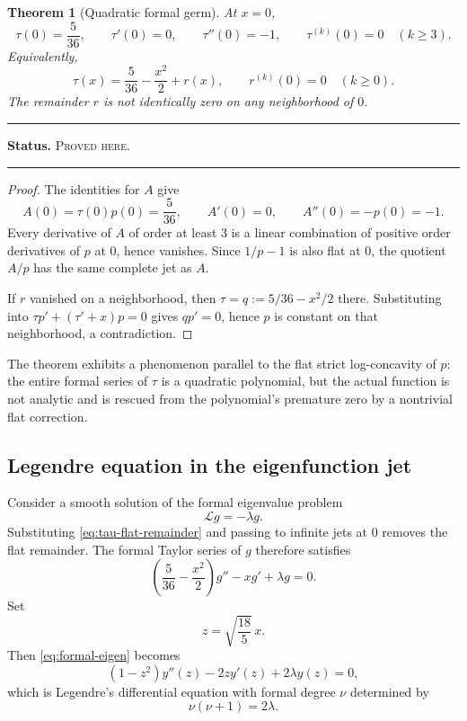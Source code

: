 \documentclass[11pt,oneside]{article}
\newtheorem{theorem}{Theorem}[section]
\theoremstyle{definition}
\theoremstyle{remark}
\newenvironment{boxedremark}{%
  \par\smallskip\noindent\begin{center}\begin{minipage}{0.94\textwidth}%
  \color{black}\hrule\vspace{0.6em}\small
}{%
  \vspace{0.6em}\hrule\end{minipage}\end{center}\smallskip
}
\newcommand{\ProvedHere}{\textsc{Proved here}}
\newcommand{\Status}[1]{%
  \begin{boxedremark}\textbf{Status.} #1.\end{boxedremark}}
\begin{document}
\begin{theorem}[Quadratic formal germ]\label{thm:tau-center-jet}
At $x=0$,
\begin{equation}\label{eq:tau-center-jet}
 \tau(0)=\frac5{36},\qquad
 \tau'(0)=0,\qquad
 \tau''(0)=-1,\qquad
 \tau^{(k)}(0)=0\quad(k\ge3).
\end{equation}
Equivalently,
\begin{equation}\label{eq:tau-flat-remainder}
 \tau(x)=\frac5{36}-\frac{x^2}{2}+r(x),
 \qquad r^{(k)}(0)=0\quad(k\ge0).
\end{equation}
The remainder $r$ is not identically zero on any neighborhood of $0$.
\end{theorem}
\Status{\ProvedHere}

\begin{proof}
The identities for $A$ give
\[
 A(0)=\tau(0)p(0)=\frac5{36},\qquad
 A'(0)=0,
 \qquad A''(0)=-p(0)=-1.
\]
Every derivative of $A$ of order at least $3$ is a linear combination of positive
order derivatives of $p$ at $0$, hence vanishes.  Since $1/p-1$ is also flat at
$0$, the quotient $A/p$ has the same complete jet as $A$.

If $r$ vanished on a neighborhood, then $\tau=q:=5/36-x^2/2$ there.  Substituting
into $\tau p'+(\tau'+x)p=0$ gives $q p'=0$, hence $p$ is constant on that
neighborhood, a contradiction.
\end{proof}

The theorem exhibits a phenomenon parallel to the flat strict log-concavity of
$p$: the entire formal series of $\tau$ is a quadratic polynomial, but the actual
function is not analytic and is rescued from the polynomial's premature zero by a
nontrivial flat correction.

\subsection{Legendre equation in the eigenfunction jet}
Consider a smooth solution of the formal eigenvalue problem
\begin{equation}\label{eq:eigenproblem}
 \mathcal Lg=-\lambda g.
\end{equation}
Substituting \eqref{eq:tau-flat-remainder} and passing to infinite jets at $0$
removes the flat remainder.  The formal Taylor series of $g$ therefore satisfies
\begin{equation}\label{eq:formal-eigen}
 \left(\frac5{36}-\frac{x^2}{2}\right)g''-xg'+\lambda g=0.
\end{equation}
Set
\begin{equation}\label{eq:legendre-scale}
 z=\sqrt{\frac{18}{5}}\,x.
\end{equation}
Then \eqref{eq:formal-eigen} becomes
\begin{equation}\label{eq:legendre-shadow}
 (1-z^2)y''(z)-2zy'(z)+2\lambda y(z)=0,
\end{equation}
which is Legendre's differential equation with formal degree $\nu$ determined by
\begin{equation}\label{eq:nu-lambda}
 \nu(\nu+1)=2\lambda.
\end{equation}
\end{document}
